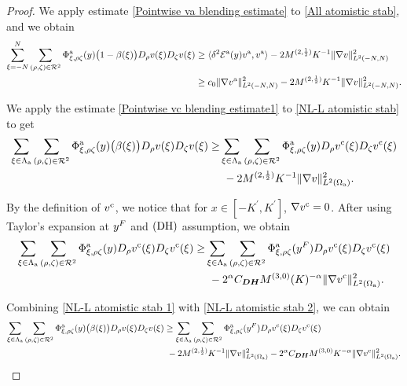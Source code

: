 \begin{proof}
	We apply estimate \eqref{Pointwise va blending estimate} to \eqref{All atomistic stab}, and we obtain
	\begin{equation}\label{Atomistic va stab result}
		\begin{split}
			\sum_{\xi=-N}^{N} \sum_{(\rho,\zeta)\in\mathcal{R}^{2}} \Phi^{{\rm a}}_{\xi,\rho\zeta} (y)\big(1-\beta(\xi)\big) D_{\rho}v(\xi) D_{\zeta}v(\xi) &\ge \langle \delta^{2} \mathcal{E}^{{\rm a}} (y)v^{\text{a}},v^{\text{a}}\rangle 
			- 2M^{(2,\frac{1}{2})}K^{-1}\Vert \nabla v \Vert_{L^{2}(-N,N)}^{2}\\
			&\ge c_{0} \Vert \nabla v^{\text{a}} \Vert_{L^{2}(-N,N)}^{2}-2M^{(2,\frac{1}{2})}K^{-1}\Vert \nabla v \Vert_{L^{2}(-N,N)}^{2}.
		\end{split}
	\end{equation}
	
	We apply the estimate \eqref{Pointwise vc blending estimate1} to \eqref{NL-L atomistic stab} to get 
	\begin{equation}\label{NL-L atomistic stab 1}
		\begin{split}
			\sum_{\xi \in \Lambda_{\rm a}} \sum_{(\rho,\zeta)\in\mathcal{R}^{2}} \Phi^{{\rm a}}_{\xi,\rho\zeta} (y)\big(\beta(\xi)\big)D_{\rho}v(\xi)D_{\zeta}v(\xi) \ge& \sum_{\xi \in \Lambda_{\rm a}} \sum_{(\rho,\zeta)\in\mathcal{R}^{2}} \Phi^{{\rm a}}_{\xi,\rho\zeta} (y)D_{\rho}v^{\text{c}}(\xi)D_{\zeta}v^{\text{c}}(\xi) \\
			&\ - 2M^{(2,\frac{1}{2})} K^{-1} \Vert \nabla v \Vert_{L^{2}(\Omega_{{\rm a}})}^{2}.
		\end{split}
	\end{equation}
	
	By the definition of $v^{\text{c}}$, we notice that for $x \in[-K^{'},K^{'}]$, $\nabla v^{\text{c}} = 0$. After using Taylor's expansion at $y^{F}$ and $\textbf{\rm (DH)}$ assumption, we obtain
	\begin{equation}\label{NL-L atomistic stab 2}
		\begin{split}
			\sum_{\xi \in \Lambda_{\rm a}} \sum_{(\rho,\zeta)\in\mathcal{R}^{2}} \Phi^{{\rm a}}_{\xi,\rho\zeta} (y)D_{\rho}v^{\text{c}}(\xi)D_{\zeta}v^{\text{c}}(\xi)\ge& \sum_{\xi \in \Lambda_{\rm a}} \sum_{(\rho,\zeta)\in\mathcal{R}^{2}} \Phi^{{\rm a}}_{\xi,\rho\zeta} (y^{F})D_{\rho}v^{\text{c}}(\xi)D_{\zeta}v^{\text{c}}(\xi)\\
			&\ -2^{\alpha}C_{\bm{DH}} M^{(3,0)}  (K)^{-\alpha} \Vert\nabla v^{\text{c}} \Vert_{L^{2}(\Omega_{{\rm a}})}^{2}.
		\end{split}
	\end{equation}
	
	Combining \eqref{NL-L atomistic stab 1} with \eqref{NL-L atomistic stab 2}, we can obtain
	\begin{equation}\label{NL-L atomistic stab result}
		\begin{split}
			\sum_{\xi \in \Lambda_{\rm a}} \sum_{(\rho,\zeta)\in\mathcal{R}^{2}} \Phi^{{\rm a}}_{\xi,\rho\zeta} (y)\big(\beta(\xi)\big)D_{\rho}v(\xi)D_{\zeta}v(\xi) &\ge \sum_{\xi \in \Lambda_{\rm a}} \sum_{(\rho,\zeta)\in\mathcal{R}^{2}} \Phi^{{\rm a}}_{\xi,\rho\zeta} (y^{F})D_{\rho}v^{\text{c}}(\xi)D_{\zeta}v^{\text{c}}(\xi) \\
			&\ - 2M^{(2,\frac{1}{2})} K^{-1} \Vert \nabla v \Vert_{L^{2}(\Omega_{{\rm a}})}^{2}-2^{\alpha}C_{\bm{DH}} M^{(3,0)}  K^{-\alpha}\Vert\nabla v^{\text{c}} \Vert_{L^{2}(\Omega_{{\rm a}})}^{2}.
		\end{split}
	\end{equation}
	

\end{proof}
